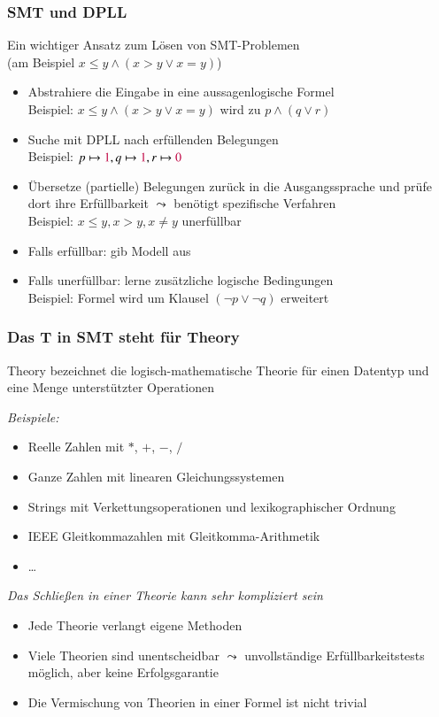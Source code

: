 \documentclass[aspectratio=1610,onlymath]{beamer}
\let\beameroriginaldoublebackslash\\
\let\\=\beameroriginaldoublebackslash
\begin{document}
\begin{frame}\frametitle{SMT und DPLL}

Ein wichtiger Ansatz zum Lösen von SMT-Problemen\\
\alert{(am Beispiel $x\leq y\wedge(x>y\vee x=y)$)}
\begin{itemize}
\item Abstrahiere die Eingabe in eine aussagenlogische Formel\\
\alert{Beispiel: $x\leq y\wedge(x>y\vee x=y)$ wird zu $p\wedge(q\vee r)$}
\item Suche mit DPLL nach erfüllenden Belegungen\\
\alert{Beispiel: $p\mapsto\textcolor{purple}{1}, q\mapsto\textcolor{purple}{1}, r\mapsto\textcolor{purple}{0}$}
\item Übersetze (partielle) Belegungen zurück in die Ausgangssprache und prüfe dort ihre Erfüllbarkeit
$\leadsto$ benötigt spezifische Verfahren\\
\alert{Beispiel: $x\leq y, x>y, x\neq y$ unerfüllbar}
\item Falls erfüllbar: gib Modell aus
\item Falls unerfüllbar: lerne zusätzliche logische Bedingungen\\
\alert{Beispiel: Formel wird um Klausel $(\neg p\vee\neg q)$ erweitert}
\end{itemize}

\end{frame}


\begin{frame}\frametitle{Das T in SMT steht für Theory}

\alert{Theory} bezeichnet die logisch-mathematische Theorie für einen Datentyp und eine Menge unterstützter Operationen
\medskip

\emph{Beispiele:}
\begin{itemize}
\item Reelle Zahlen mit $*$, $+$, $-$, $/$
\item Ganze Zahlen mit linearen Gleichungssystemen
\item Strings mit Verkettungsoperationen und lexikographischer Ordnung
\item IEEE Gleitkommazahlen mit Gleitkomma-Arithmetik
\item \ldots
\end{itemize}
\medskip\pause

\emph{Das Schließen in einer Theorie kann sehr kompliziert sein}
\begin{itemize}
\item Jede Theorie verlangt eigene Methoden
\item Viele Theorien sind unentscheidbar $\leadsto$ unvollständige Erfüllbarkeitstests möglich, aber keine Erfolgsgarantie 
\item Die Vermischung von Theorien in einer Formel ist nicht trivial 
\end{itemize}

\end{frame}
\end{document}
